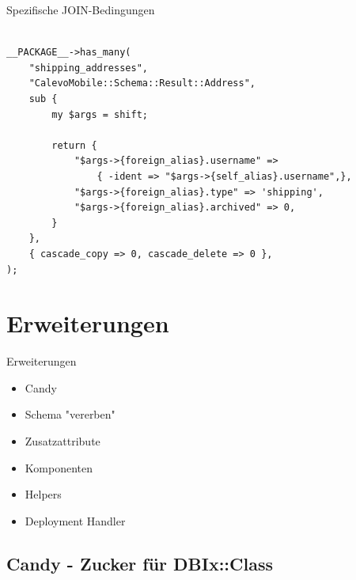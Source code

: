 \begin{frame}[fragile]{Spezifische JOIN-Bedingungen}
\begin{lstlisting}

__PACKAGE__->has_many(
    "shipping_addresses",
    "CalevoMobile::Schema::Result::Address",
    sub {
        my $args = shift;

        return {
            "$args->{foreign_alias}.username" =>
                { -ident => "$args->{self_alias}.username",},
            "$args->{foreign_alias}.type" => 'shipping',
            "$args->{foreign_alias}.archived" => 0,
        }
    },
    { cascade_copy => 0, cascade_delete => 0 },
);
\end{lstlisting}
\end{frame}


\section{Erweiterungen}

\begin{frame}{Erweiterungen}
\begin{itemize}
\item Candy
\item Schema "vererben"
\item Zusatzattribute
\item Komponenten
\item Helpers
\item Deployment Handler
\end{itemize}
\end{frame}

\subsection{Candy - Zucker für DBIx::Class}


